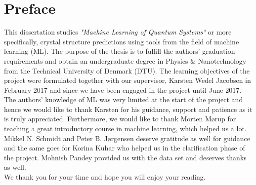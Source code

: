 \iffalse
\chapter*{Resum\'e}
\markboth{RESUME}{RESUME}
Afhandlingen omhandler machine learning af kvantesystemer. Mere specifikt, forudsigelse af forskellen i formationsenergi af AB-dimere mellem for fire forskellige krystalstrukture.

Ydermere er det blevet forsøgt at finde et universelt sæt af egenskaber, der kan bruges til relativt nøjagtig bestemmelse af formationsenergier. Hvis sådan et sæt kan findes samt det er muligt at forudsige hvilken en af strukturene, der vil være mest stabile i naturen - vil dette kunne bruges til at effektivisere screening af potentielle materialer til eksempelvis solceller.
\\[20mm]
\fi
\chapter*{Preface}
This dissertation studies \emph{"Machine Learning of Quantum Systems"} or more specifically, crystal structure predictions using tools from the field of machine learning (ML). The purpose of the thesis is to fulfill the authors' graduation requirements and obtain an undergraduate degree in Physics \& Nanotechnology from the Technical University of Denmark (DTU). The learning objectives of the project were formulated together with our supervisor, Karsten Wedel Jacobsen in February 2017 and since we have been engaged in the project until June 2017. The authors' knowledge of ML was very limited at the start of the project and hence we would like to thank Karsten for his guidance, support and patience as it is truly appreciated. Furthermore, we would like to thank Morten Mørup for teaching a great introductory course in machine learning, which helped us a lot. Mikkel N. Schmidt and Peter B. Jørgensen deserve gratitude as well for guidance and the same goes for Korina Kuhar who helped us in the clarification phase of the project. Mohnish Pandey provided us with the data set and deserves thanks as well. \\[5mm]
We thank you for your time and hope you will enjoy your reading.

